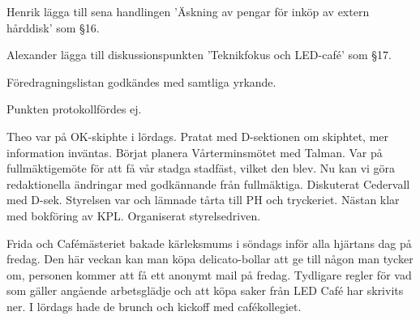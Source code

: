 \documentclass[10pt]{article}
\begin{document}
\begin{paragrafer}


Henrik \ypa lägga till sena handlingen 'Äskning av pengar för inköp av extern hårddisk' som §16.

Alexander \ypa lägga till diskussionspunkten 'Teknikfokus och LED-café' som §17.

Föredragningslistan godkändes med samtliga yrkande.


\begin{fyllnadsval} %




\end{fyllnadsval}

\begin{paragrafer}

Punkten protokollfördes ej.


Theo var på OK-skiphte i lördags. 
Pratat med D-sektionen om skiphtet, mer information inväntas. 
Börjat planera Vårterminsmötet med Talman. 
Var på fullmäktigemöte för att få vår stadga stadfäst, vilket den blev. 
Nu kan vi göra redaktionella ändringar med godkännande från fullmäktiga.
Diskuterat Cedervall med D-sek. Styrelsen var och lämnade tårta till PH och tryckeriet. 
Nästan klar med bokföring av KPL. 
Organiserat styrelsedriven.

Frida och Cafémästeriet bakade kärleksmums i söndags inför alla hjärtans dag på fredag. 
Den här veckan kan man köpa delicato-bollar att ge till någon man tycker om, personen kommer att få ett anonymt mail på fredag. 
Tydligare regler för vad som gäller angående arbetsglädje och att köpa saker från LED Café har skrivits ner. 
I lördags hade de brunch och kickoff med cafékollegiet.


\end{paragrafer}
\end{paragrafer}
\end{document}
